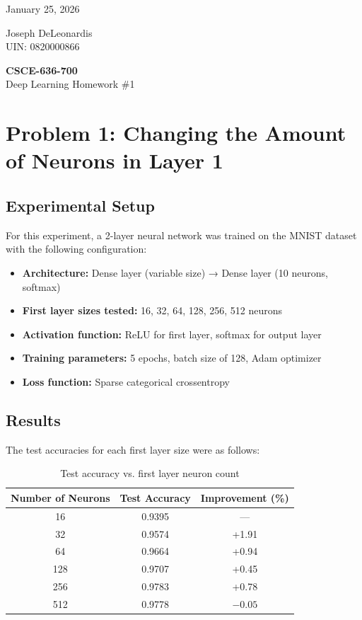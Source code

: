 \documentclass{article}
\begin{document}
\noindent
\begin{minipage}[t]{0.5\textwidth}
    \raggedright
    January 25, 2026
\end{minipage}%
\begin{minipage}[t]{0.5\textwidth}
    \raggedleft
    Joseph DeLeonardis\\
    UIN: 0820000866
\end{minipage}
\vspace{0.5cm}
\begin{center}
    \textbf{\Large CSCE-636-700}\\
    Deep Learning Homework \#1
\end{center}
\vspace{1cm}

\section*{Problem 1: Changing the Amount of Neurons in Layer 1}

\subsection*{Experimental Setup}

For this experiment, a 2-layer neural network was trained on the MNIST dataset with the following configuration:
\begin{itemize}
    \item \textbf{Architecture:} Dense layer (variable size) → Dense layer (10 neurons, softmax)
    \item \textbf{First layer sizes tested:} 16, 32, 64, 128, 256, 512 neurons
    \item \textbf{Activation function:} ReLU for first layer, softmax for output layer
    \item \textbf{Training parameters:} 5 epochs, batch size of 128, Adam optimizer
    \item \textbf{Loss function:} Sparse categorical crossentropy
\end{itemize}

\subsection*{Results}

The test accuracies for each first layer size were as follows:

\begin{table}[h]
\centering
\begin{tabular}{|c|c|c|}
\hline
\textbf{Number of Neurons} & \textbf{Test Accuracy} & \textbf{Improvement (\%)} \\
\hline
16 & 0.9395 & --- \\
32 & 0.9574 & +1.91 \\
64 & 0.9664 & +0.94 \\
128 & 0.9707 & +0.45 \\
256 & 0.9783 & +0.78 \\
512 & 0.9778 & $-0.05$ \\
\hline
\end{tabular}
\caption{Test accuracy vs. first layer neuron count}
\end{table}
\end{document}
